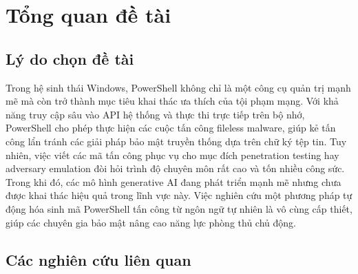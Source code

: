 \chapter{Tổng quan đề tài}\label{Chapter1}




\section{Lý do chọn đề tài}

Trong hệ sinh thái Windows, PowerShell không chỉ là một công cụ quản trị mạnh mẽ mà còn trở thành mục tiêu khai thác ưa thích của tội phạm mạng. Với khả năng truy cập sâu vào API hệ thống và thực thi trực tiếp trên bộ nhớ, PowerShell cho phép thực hiện các cuộc tấn công fileless malware, giúp kẻ tấn công lẩn tránh các giải pháp bảo mật truyền thống dựa trên chữ ký tệp tin. Tuy nhiên, việc viết các mã tấn công phục vụ cho mục đích penetration testing hay adversary emulation đòi hỏi trình độ chuyên môn rất cao và tốn nhiều công sức. Trong khi đó, các mô hình generative AI đang phát triển mạnh mẽ nhưng chưa được khai thác hiệu quả trong lĩnh vực này. Việc nghiên cứu một phương pháp tự động hóa sinh mã PowerShell tấn công từ ngôn ngữ tự nhiên là vô cùng cấp thiết, giúp các chuyên gia bảo mật nâng cao năng lực phòng thủ chủ động.





\section{Các nghiên cứu liên quan}

